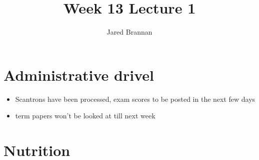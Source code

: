 \documentclass{article}
\title{Week 13 Lecture 1}
\author{Jared Brannan }
\theoremstyle{definition}
\begin{document}
\maketitle

\section{Administrative drivel}
\begin{itemize}
	\item Scantrons have been processed, exam scores to be posted in the next few days
	\item term papers won't be looked at till next week
\end{itemize}

\section{Nutrition}
\end{document}
